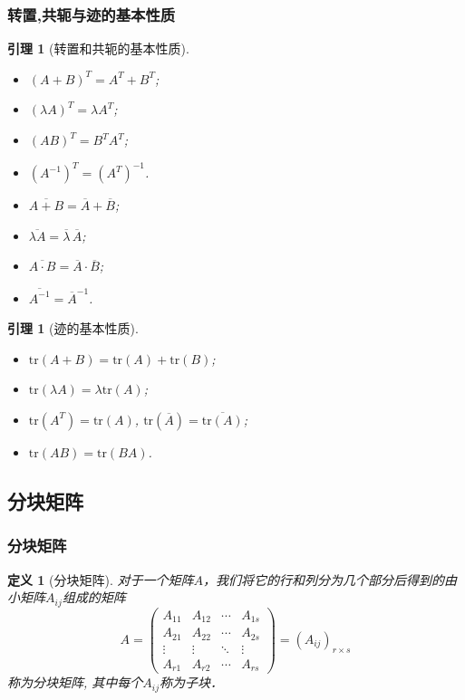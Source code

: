 \documentclass{article}
\newtheorem{definition}[theorem]{定义}
\newtheorem{lemma}[theorem]{引理}
\renewcommand{\blue }[1]{{\textcolor[rgb]{0,0,1}{#1}}}
\begin{document}
\subsubsection{转置,共轭与迹的基本性质}
\begin{lemma}[转置和共轭的基本性质]
\begin{itemize}
\item $(A+B)^T=A^T+B^T$;
\item $(\lambda A)^T=\lambda A^T$;
\item  $(AB)^T=B^TA^T$;
\item $(A^{-1})^T=(A^T)^{-1}$.
\end{itemize}
\begin{itemize}
\item $\overline{A+B}=\overline{A}+\overline{B}$;
\item $\overline{\lambda A}=\overline{\lambda}\,\overline{A}$;
\item $\overline{A\cdot B}=\overline{A}\cdot\overline{B}$;
\item $\overline{A^{-1}}=\overline{A}^{-1}$.
\end{itemize}
\end{lemma}
\begin{lemma}[迹的基本性质]
\begin{itemize}
\item $\mathrm{tr}(A+B)=\mathrm{tr}(A)+\mathrm{tr}(B)$;
\item $\mathrm{tr}(\lambda A)=\lambda\mathrm{tr}(A)$;
\item $\mathrm{tr}(A^T)=\mathrm{tr}(A)$, \quad   $\mathrm{tr}(\overline{A})=\overline{\mathrm{tr}(A)}$;
\item $\mathrm{tr}(AB)=\mathrm{tr}(BA)$.
\end{itemize}
\end{lemma}


\subsection{分块矩阵}

\subsubsection{分块矩阵}
\begin{definition}[分块矩阵]
对于一个矩阵$A$，我们将它的行和列分为几个部分后得到的由小矩阵$A_{ij}$组成的矩阵
\[ A = \left(\begin{array}{cccc}
A_{11} & A_{12} & \cdots & A_{1 s}\\
A_{21} & A_{22} & \cdots & A_{2 s}\\
\vdots & \vdots & \ddots & \vdots\\
A_{r 1} & A_{r 2} & \cdots & A_{rs}
\end{array}\right) = (A_{ij})_{r \times s} \]
称为\blue{分块矩阵}, 其中每个$A_{ij}$称为\blue{子块}．
\end{definition}
\end{document}
